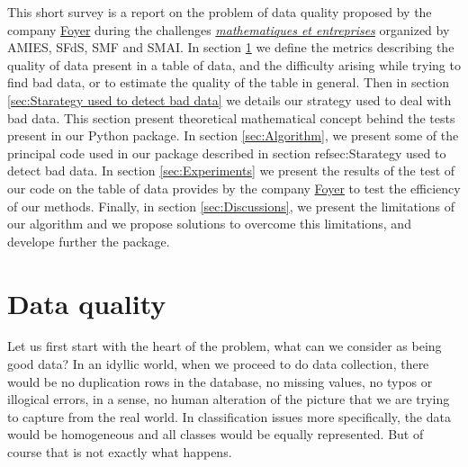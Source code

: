 \documentclass{article}
\begin{document}
This short survey is a report on the problem of data quality proposed by the company \href{ https://www.foyer.lu/en/homepage}{Foyer} during the challenges \href{https://challenge-maths.sciencesconf.org/}{\textit{mathematiques et entreprises}} organized by AMIES,  SFdS, SMF and SMAI.
In section \ref{sec:Data quality} we define the metrics describing the quality of data present in a table of data, and the difficulty arising while trying to find bad data, or to estimate the quality of the table in general. Then in section \ref{sec:Starategy used to detect bad data} we details our strategy used to deal with bad data. This section present theoretical mathematical concept behind the tests present in our Python package. In section \ref{sec:Algorithm}, we present some of the principal code used in our package described in section ref{sec:Starategy used to detect bad data}. In section \ref{sec:Experiments} we present the results of the test of our code on the table of data provides by the company \href{ https://www.foyer.lu/en/homepage}{Foyer} to test the efficiency of our methods. Finally, in section \ref{sec:Discussions}, we present the limitations of our algorithm and we propose solutions to overcome this limitations, and develope further the package.


\section{Data quality} %
\label{sec:Data quality}
Let us first start with the heart of the problem, what can we consider as being good data? In an idyllic world, when we proceed to do data collection, there would be no duplication rows in the database, no missing values, no typos or illogical errors, in a sense, no human alteration of the picture that we are trying to capture from the real world. In classification issues more specifically, the data would be homogeneous and all classes would be equally represented. But of course that is not exactly what happens. \\
\end{document}
